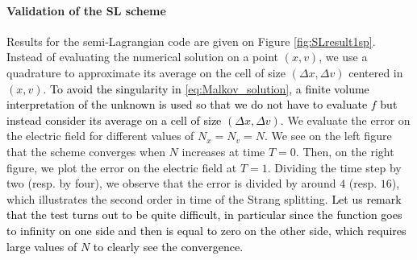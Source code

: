 \documentclass{article}
\numberwithin{equation}{section}
\newcommand{\todo}[1]{{\color{red}\textbf{#1}}}
\begin{document}



%	


\paragraph{Validation of the SL scheme}

Results for the semi-Lagrangian code are given on Figure \ref{fig:SLresult1sp}. Instead of evaluating the numerical solution on a point $(x,v)$, we use a quadrature to approximate its average on the cell of size $(\Delta x, \Delta v)$ centered in $(x,v)$.  
\textcolor{black}{To avoid the singularity in \eqref{eq:Malkov_solution}, a finite volume interpretation of the unknown is used so that we do not 
have to evaluate $f$ but instead consider its average on a cell of size $(\Delta x, \Delta v)$.} 
We evaluate the error on the electric field for different values of $N_x=N_v=N$. We see on the left figure that the scheme converges when $N$ increases at  time $T=0$.
Then, on the right figure, we plot the error on the electric field at $T=1$. Dividing the time step by two (resp. by four), we observe that the error is divided by around $4$ (resp. $16$), which illustrates the second order in time of the Strang splitting. \textcolor{black}{Let us remark that 
the test turns out to be quite difficult, in particular since the function goes to infinity on one side and then is equal to zero on the other side, 
which requires large values of $N$ to clearly see the convergence.}
\end{document}
